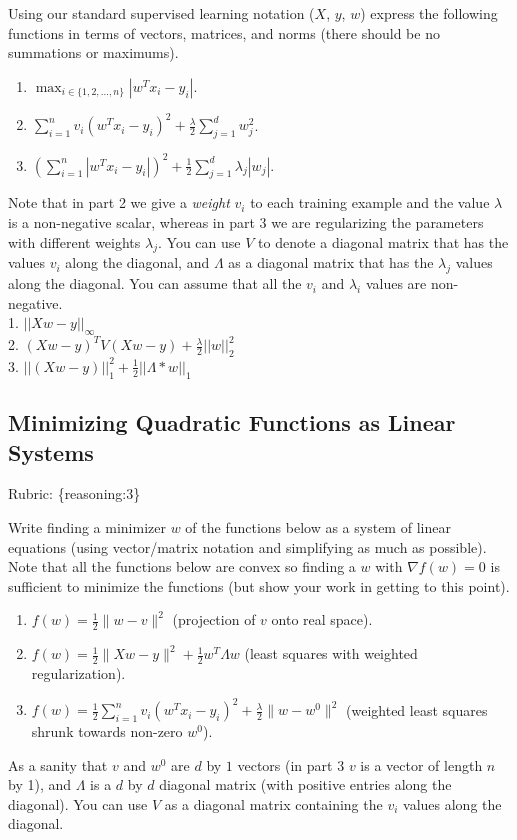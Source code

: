 \documentclass{article}
\def\rubric#1{\gre{Rubric: \{#1\}}}{}
\def\blu#1{{\color{blu}#1}}
\def\gre#1{{\color{gre}#1}}
\def\red#1{{\color{red}#1}}
\def\norm#1{\|#1\|}
\def\half{\frac 1 2}
\def\enum#1{\begin{enumerate}#1\end{enumerate}}
\begin{document}
Using our standard supervised learning notation ($X$, $y$, $w$)
express the following functions in terms of vectors, matrices, and norms (there should be no summations or maximums).
\blu{\enum{
\item $\max_{i \in \{1,2,\dots,n\}}  |w^Tx_i - y_i|$. 
\item $\sum_{i=1}^n v_i(w^Tx_i  - y_i)^2 + \frac{\lambda}{2}\sum_{j=1}^d w_j^2$.
\item $\left(\sum_{i=1}^n |w^Tx_i - y_i|\right)^2 +  \half\sum_{j=1}^{d} \lambda_j|w_j|$.
}}
Note that in part 2 we give a \emph{weight} $v_i$ to each training example \red{and the value $\lambda$ is a non-negative scalar}, whereas in part 3 we are regularizing the parameters with different weights $\lambda_j$.
You can use $V$ to denote a diagonal matrix that has the values $v_i$ along the diagonal, and $\Lambda$ as a diagonal matrix that has the $\lambda_j$ values along the diagonal. You can assume that all the $v_i$ and $\lambda_i$ values are non-negative. 
\red{\\1. $||Xw-y||_\infty$ \\
2. $(Xw-y)^TV(Xw-y) + \frac{\lambda}{2}||w||_2^2$ \\
3. $||(Xw-y)||_1^2+\frac{1}{2}||\Lambda*w||_1$}

\subsection{Minimizing Quadratic Functions as Linear Systems}
\rubric{reasoning:3}

Write finding a minimizer $w$ of the functions below as a system of linear equations (using vector/matrix notation and simplifying as much as possible). Note that all the functions below are convex  so finding a $w$ with $\nabla f(w) = 0$ is sufficient to minimize the functions (but show your work in getting to this point).

\blu{\enum{
\item $f(w) = \frac{1}{2}\norm{w-v}^2$ (projection of $v$ onto real space).
\item $f(w)= \frac{1}{2}\norm{Xw - y}^2 + \frac{1}{2}w^T\Lambda w$ (least squares with weighted regularization).
\item $f(w) = \frac{1}{2}\sum_{i=1}^n v_i (w^Tx_i - y_i)^2 + \frac{\lambda}{2}\norm{w-w^0}^2$ (weighted least squares shrunk towards non-zero $w^0$).
}}
As a sanity that $v$ and $w^0$ are $d$ by $1$ vectors (in part 3 $v$ is a vector of length $n$ by 1), and $\Lambda$ is a $d$ by $d$ diagonal matrix (with positive entries along the diagonal). You can use $V$ as a diagonal matrix containing the $v_i$ values along the diagonal.
\end{document}
